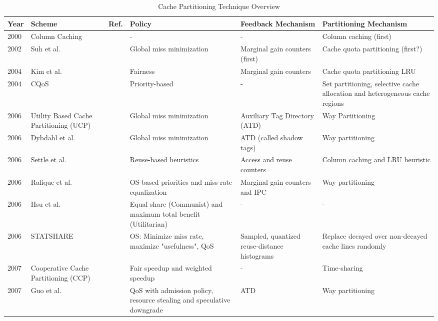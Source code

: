 
\begin{table*}[tp]
    \caption{Cache Partitioning Technique Overview}
    \label{tab:cachePartTaxonomy}
    \begin{tabularx}{\textwidth}{llcXXX}
    \toprule
    Year & Scheme & Ref. & Policy & Feedback Mechanism & Partitioning Mechanism \\    
    \midrule
    2000 & Column Caching & \cite{columnCaching} & - & - & Column caching (first) \\
    2002 & Suh et al. & \cite{suh02,dynPartofSharedCacheMemory} & Global miss minimization & Marginal gain counters (first) & Cache quota partitioning (first?) \\
    2004 & Kim et al. & \cite{fairCacheSharingAndPartitioning} & Fairness & Marginal gain counters & Cache quota partitioning LRU \\
    2004 & CQoS & \cite{cqos} & Priority-based & - & Set partitioning, selective cache allocation and heterogeneous cache regions \\
    2006 & Utility Based Cache Partitioning (UCP) & \cite{utilityBasedCachePartitioning} & Global miss minimization & Auxiliary Tag Directory (ATD) & Way Partitioning \\ 
    2006 & Dybdahl et al. & \cite{haakonHiPC} & Global miss minimization & ATD (called shadow tags) & Way partitioning \\
    2006 & Settle et al. & \cite{dynReconfCache} & Reuse-based heuristics & Access and reuse counters & Column caching and LRU heuristic \\
    2006 & Rafique et al. & \cite{osSupportForFairCacheSharing} & OS-based priorities and miss-rate equalization \cite{fairCacheSharingAndPartitioning} & Marginal gain counters and IPC & Way partitioning \\
    2006 & Hsu et al. & \cite{sharedCachePolicies} & Equal share (Communist) and maximum total benefit (Utilitarian) & - & - \\
    2006 & STATSHARE & \cite{petoumenos06} & OS: Minimize miss rate, maximize "usefulness", QoS  & Sampled, quantized reuse-distance histograms  & Replace decayed over non-decayed cache lines randomly\\
    2007 & Cooperative Cache Partitioning (CCP) & \cite{cooperativeCachePartitioning} & Fair speedup and weighted speedup & - & Time-sharing \\
    2007 & Guo et al. & \cite{qosInCMPs} & QoS with admission policy, resource stealing and speculative downgrade  & ATD & Way partitioning \\

\end{tabularx}
\end{table*}
